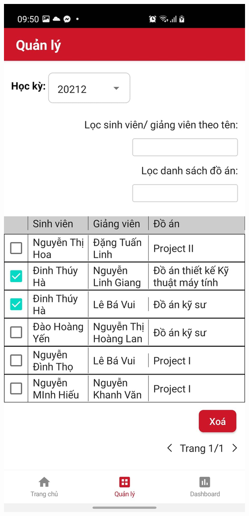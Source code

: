 \documentclass[../Main.tex]{subfiles}
\begin{document}
\begin{minipage}{0.5\textwidth}
\includegraphics[width=0.66\linewidth]{Figure/screen/delete_assign_1.jpeg}
 \label{Figure/screen/information_topic}
\end{minipage}
\hspace{\fill}
\end{document}
